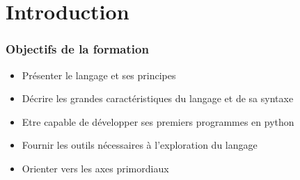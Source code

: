 \section{Introduction}

\begin{frame}
\frametitle{Objectifs de la formation}
  \begin{itemize}
  \item Présenter le langage et ses principes
  \item Décrire les grandes caractéristiques du langage et de sa syntaxe
  \item Etre capable de développer ses premiers programmes en python
  \item Fournir les outils nécessaires à l'exploration du langage
  \item Orienter vers les axes primordiaux
  \end{itemize}
\end{frame}


